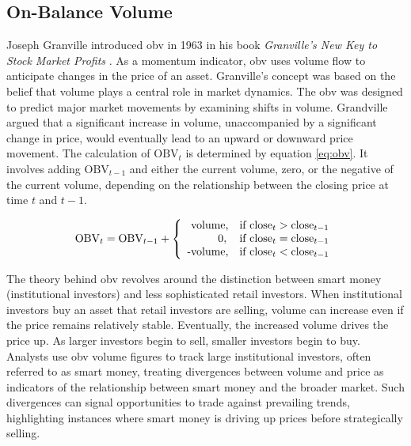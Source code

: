 \subsection{On-Balance Volume}
\label{sub:OBV}
Joseph Granville introduced \gls{obv} in 1963 in his book \textit{Granville's New Key to Stock Market Profits} \citep{granville1963new}. As a momentum indicator, \gls{obv} uses volume flow to anticipate changes in the price of an asset.
\newline
\newline
Granville's concept was based on the belief that volume plays a central role in market dynamics. The \gls{obv} was designed to predict major market movements by examining shifts in volume. Grandville argued that a significant increase in volume, unaccompanied by a significant change in price, would eventually lead to an upward or downward price movement.
\newline
\newline
The calculation of $\text{OBV}_t$ is determined by equation \ref{eq:obv}. It involves adding $\text{OBV}_{t-1}$ and either the current volume, zero, or the negative of the current volume, depending on the relationship between the closing price at time $t$ and $t-1$.

\begin{equation}
    \centering
    \text{OBV}_t = \text{OBV}_{t-1} + \left\{ \begin{array}{rcl}
    \text{volume,} \quad \text{if close}_t > \text{close}_{t-1} \\
    0, \quad \text{if close}_t = \text{close}_{t-1} \\
    \text{-volume,} \quad \text{if close}_t < \text{close}_{t-1}
    \end{array}\right.
    \label{eq:obv}
\end{equation}

\noindent
The theory behind \gls{obv} revolves around the distinction between smart money (institutional investors) and less sophisticated retail investors. When institutional investors buy an asset that retail investors are selling, volume can increase even if the price remains relatively stable. Eventually, the increased volume drives the price up. As larger investors begin to sell, smaller investors begin to buy.
\newline
\newline
Analysts use \gls{obv} volume figures to track large institutional investors, often referred to as smart money, treating divergences between volume and price as indicators of the relationship between smart money and the broader market. Such divergences can signal opportunities to trade against prevailing trends, highlighting instances where smart money is driving up prices before strategically selling.

